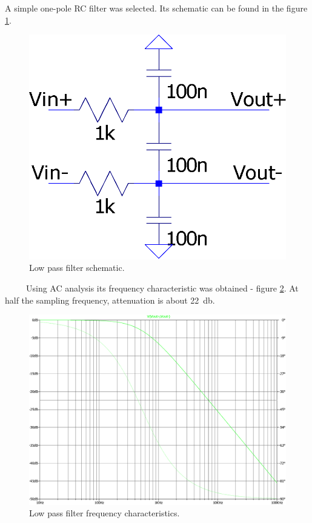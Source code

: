         A simple one-pole RC filter was selected. Its schematic can be found in the figure \ref{low_pass_filter}.

        \begin{figure}[H]
            \centering
            \includegraphics[width=0.3\paperwidth]{img/06/low_pass_filter.eps}
            \caption{Low pass filter schematic.}
            \label{low_pass_filter}
        \end{figure}

        Using AC analysis its frequency characteristic was obtained - figure \ref{low_pass_filter_output}. At half the sampling frequency, attenuation is about \SI{22}{\decibel}.

        \begin{figure}[H]
            \centering
            \includegraphics[width=0.6\paperwidth]{img/06/low_pass_filter_output.eps}
            \caption{Low pass filter frequency characteristics.}
            \label{low_pass_filter_output}
        \end{figure}

